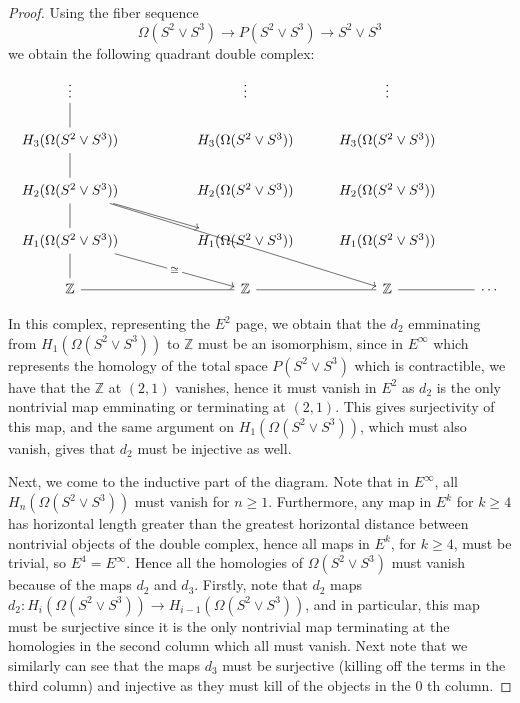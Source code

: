 \documentclass[reqno]{amsart}
\theoremstyle{definition}
\theoremstyle{remark}
\begin{document}
    \begin{proof}
        Using the fiber sequence
        \[
        \Omega \left( S^2 \vee S^3 \right) 
        \to P \left( S^2 \vee S^3 \right) 
        \to S^2 \vee S^3
        \] 
        we obtain the following quadrant double complex:
        \[\begin{tikzcd}
	\vdots && \vdots & \vdots \\
	{H_3(\Omega (S^2 \vee S^3))} && {H_3(\Omega (S^2 \vee S^3))} & {H_3(\Omega (S^2 \vee S^3))} \\
	{H_2(\Omega (S^2 \vee S^3))} && {H_2(\Omega (S^2 \vee S^3))} & {H_2(\Omega (S^2 \vee S^3))} \\
	{H_1(\Omega (S^2 \vee S^3))} && {H_1(\Omega (S^2 \vee S^3))} & {H_1(\Omega (S^2 \vee S^3))} \\
	\mathbb{Z} && \mathbb{Z} & \mathbb{Z} & \cdots
	\arrow[no head, from=2-1, to=1-1]
	\arrow[no head, from=3-1, to=2-1]
	\arrow[from=3-1, to=4-3]
	\arrow[from=3-1, to=5-4]
	\arrow[no head, from=4-1, to=3-1]
	\arrow["\cong"{description}, from=4-1, to=5-3]
	\arrow[no head, from=5-1, to=4-1]
	\arrow[no head, from=5-1, to=5-3]
	\arrow[no head, from=5-3, to=5-4]
	\arrow[no head, from=5-4, to=5-5]
\end{tikzcd}\]

In this complex, representing
the $E^2$ page, we obtain that
the $d_2$ emminating from
$H_1 \left( \Omega \left( S^2 \vee S^3 \right)  \right) $ 
to $\mathbb{Z}$ must be an isomorphism,
since in $E^{\infty}$ which represents
the homology of the total space 
$P \left( S^2 \vee S^3 \right) $ which is
contractible,
we have that the $\mathbb{Z}$ at
$(2,1)$ vanishes, hence
it must vanish in $E^2$ as
$d_2$ is the only nontrivial map emminating
or terminating at $(2,1)$. This gives surjectivity
of this map, and the same argument
on $H_1 \left( \Omega
\left( S^2 \vee S^3 \right) \right) $, which must also
vanish, gives that
$d_2$ must be injective as well.

Next, we come to the inductive part of the
diagram.
Note that in $E^{\infty}$, all
$H_n \left( \Omega \left( S^2 \vee S^3 \right)  \right) $ 
must vanish for $n \ge 1$. Furthermore,
any map in
$E^{k}$ for $k\ge 4$ has horizontal
length greater than the greatest horizontal distance
between nontrivial objects of the double complex,
hence all maps in $E^{k}$, for $k\ge 4$, must be
trivial, so
$E^{4} = E^{\infty}$. Hence
all the homologies
of $\Omega \left( S^2 \vee S^3 \right) $ must
vanish because of the maps
$d_2$ and $d_3$.
Firstly, note that
$d_2$ maps
$d_2 \colon
H_i \left( \Omega \left( S^2 \vee S^3 \right)  \right) 
\to H_{i-1} 
\left( \Omega \left( S^2 \vee S^3 \right)  \right) $, and
in particular, this map must be surjective
since it is the only nontrivial map
terminating at the homologies
in the second column which all must vanish.
Next note that
we similarly can see that
the maps
$ d_3$ must be surjective (killing off the
terms in the third column) and
injective as they must kill of the objects in the
$0$ th column.


\end{proof}
\end{document}
